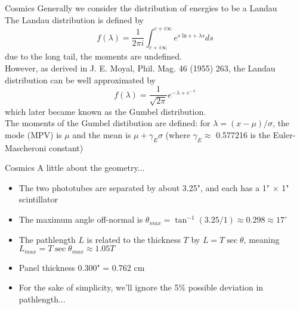\documentclass[compress,8pt]{beamer} %
\begin{document}
\begin{frame}{Cosmics}
Generally we consider the distribution of energies to be a Landau \\
The Landau distribution is defined by
\begin{equation*}
f(\lambda) = \frac{1}{2\pi i} \int_{c+i\infty}^{c+i\infty} e^{s \ln s + \lambda s} ds
\end{equation*}
due to the long tail, the moments are undefined. \\
\vspace{10pt}
However, as derived in  J. E. Moyal, Phil. Mag. 46 (1955) 263, the Landau distribution can be well approximated by
\begin{equation*}
f(\lambda) = \frac{1}{\sqrt{2\pi}} e^{-\lambda+e^{-\lambda}}
\end{equation*}
which later became known as the Gumbel distribution. \\
The moments of the Gumbel distibution are defined:
for $\lambda = (x-\mu)/\sigma$, the mode (MPV) is $\mu$ and the mean is $\mu + \gamma_E\sigma$
(where $\gamma_E \approx$ 0.577216 is the Euler-Mascheroni constant)
\end{frame}



\begin{frame}{Cosmics}
A little about the geometry...
\begin{itemize}
\item The two phototubes are separated by about 3.25", and each has a 1" $\times$ 1" scintillator
\item The maximum angle off-normal is
$\theta_{max} = \tan^{-1}(3.25/1) \approx 0.298 \approx 17^{\circ} $
\item The pathlength $L$ is related to the thickness $T$ by $L = T \sec \theta$,
meaning $L_{max} = T \sec \theta_{max} \approx 1.05T$
\item Panel thickness 0.300" = 0.762 cm
\item For the sake of simplicity, we'll ignore the 5\% possible deviation in pathlength...
\end{itemize}
\end{frame}
\end{document}
